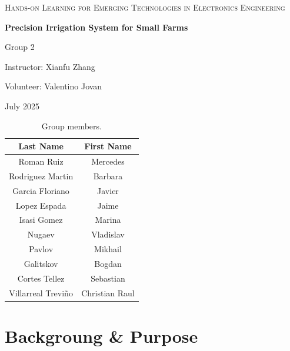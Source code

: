 \documentclass{IEEEtran}
\def\TituloProyecto{Precision Irrigation System for Small Farms}
\def\Fecha{July 2025}
\def\Profesor{Xianfu Zhang}
\def\Voluntario{Valentino Jovan}
\begin{document}
\sloppy 
\setlength{\parindent}{30pt}
\setlength{\parskip}{6pt}
\renewcommand\thesection{\arabic{section}}
\renewcommand{\baselinestretch}{1.5}

\begin{titlepage}
    \centering
    \vfill
    {\scshape\Large Hands-on Learning for Emerging Technologies in Electronics Engineering \par}
    \vfill
    {\Huge \textbf{\TituloProyecto} \par}
    \vfill
    {\Large Group 2 \par}
    {\Large Instructor: \Profesor \par}
    {\Large Volunteer: \Voluntario \par}
    {\Large \Fecha\par}
\end{titlepage}

\newpage

\begin{table}[h!]
    \centering
    \caption{Group members.}
    \label{tab:Members}
    \begin{tabular}{|c|c|}
        \hline
        Last Name & First Name \\
        \hline
        Roman Ruiz & Mercedes \\
        Rodriguez Martin & Barbara \\
        Garcia Floriano & Javier \\
        Lopez Espada & Jaime \\
        Isasi Gomez & Marina \\
        Nugaev & Vladislav \\
        Pavlov & Mikhail \\
        Galitskov & Bogdan \\
        Cortes Tellez & Sebastian \\
        Villarreal Treviño & Christian Raul \\
        \hline
    \end{tabular}
\end{table}

\tableofcontents

\section*{Backgroung \& Purpose}
\end{document}
